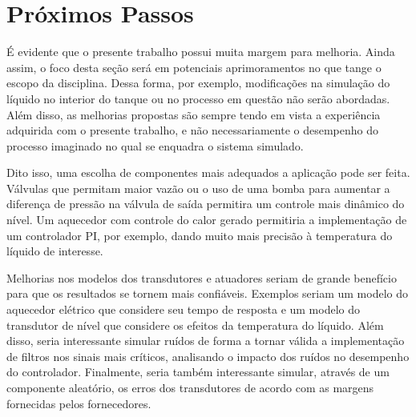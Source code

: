 \section{Próximos Passos}

É evidente que o presente trabalho possui muita margem para melhoria. Ainda assim, o foco desta seção será em potenciais aprimoramentos no que tange o escopo da disciplina. Dessa forma, por exemplo, modificações na simulação do líquido no interior do tanque ou no processo em questão não serão abordadas. Além disso, as melhorias propostas são sempre tendo em vista a experiência adquirida com o presente trabalho, e não necessariamente o desempenho do processo imaginado no qual se enquadra o sistema simulado.

Dito isso, uma escolha de componentes mais adequados a aplicação pode ser feita. Válvulas que permitam maior vazão ou o uso de uma bomba para aumentar a diferença de pressão na válvula de saída permitira um controle mais dinâmico do nível. Um aquecedor com controle do calor gerado permitiria a implementação de um controlador PI, por exemplo, dando muito mais precisão à temperatura do líquido de interesse.

Melhorias nos modelos dos transdutores e atuadores seriam de grande benefício para que os resultados se tornem mais confiáveis. Exemplos seriam um modelo do aquecedor elétrico que considere seu tempo de resposta e um modelo do transdutor de nível que considere os efeitos da temperatura do líquido. Além disso, seria interessante simular ruídos de forma a tornar válida a implementação de filtros nos sinais mais críticos, analisando o impacto dos ruídos no desempenho do controlador. Finalmente, seria também interessante simular, através de um componente aleatório, os erros dos transdutores de acordo com as margens fornecidas pelos fornecedores.

